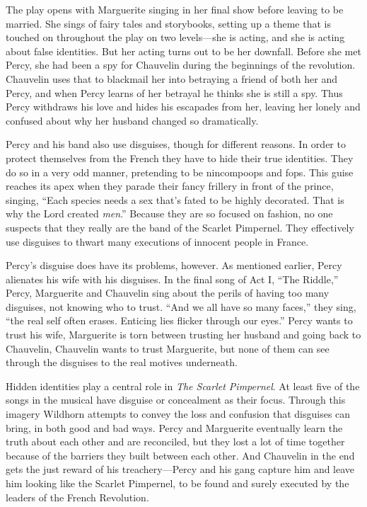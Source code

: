 \documentclass[onecolumn, 12pt]{article}
\begin{document}
The play opens with Marguerite singing in her final show before leaving to be
married.  She sings of fairy tales and storybooks, setting up a theme that is
touched on throughout the play on two levels---she is acting, and she is acting
about false identities.  But her acting turns out to be her downfall.  Before
she met Percy, she had been a spy for Chauvelin during the beginnings of the
revolution.  Chauvelin uses that to blackmail her into betraying a friend of
both her and Percy, and when Percy learns of her betrayal he thinks she is
still a spy.  Thus Percy withdraws his love and hides his escapades from her,
leaving her lonely and confused about why her husband changed so dramatically.

Percy and his band also use disguises, though for different reasons.  In order
to protect themselves from the French they have to hide their true identities.
They do so in a very odd manner, pretending to be nincompoops and fops.  This
guise reaches its apex when they parade their fancy frillery in front of the
prince, singing, ``Each species needs a sex that's fated to be highly
decorated.  That is why the Lord created \emph{men}.''  Because they are so
focused on fashion, no one suspects that they really are the band of the
Scarlet Pimpernel.  They effectively use disguises to thwart many executions of
innocent people in France.

Percy's disguise does have its problems, however.  As mentioned earlier, Percy
alienates his wife with his disguises.  In the final song of Act I, ``The
Riddle,'' Percy, Marguerite and Chauvelin sing about the perils of having too
many disguises, not knowing who to trust.  ``And we all have so many faces,''
they sing, ``the real self often erases.  Enticing lies flicker through our
eyes.''  Percy wants to trust his wife, Marguerite is torn between trusting her
husband and going back to Chauvelin, Chauvelin wants to trust Marguerite, but
none of them can see through the disguises to the real motives underneath.

Hidden identities play a central role in \emph{The Scarlet Pimpernel}.  At
least five of the songs in the musical have disguise or concealment as their
focus.  Through this imagery Wildhorn attempts to convey the loss and confusion
that disguises can bring, in both good and bad ways.  Percy and Marguerite
eventually learn the truth about each other and are reconciled, but they lost a
lot of time together because of the barriers they built between each other.
And Chauvelin in the end gets the just reward of his treachery---Percy and his
gang capture him and leave him looking like the Scarlet Pimpernel, to be found
and surely executed by the leaders of the French Revolution.
\end{document}
